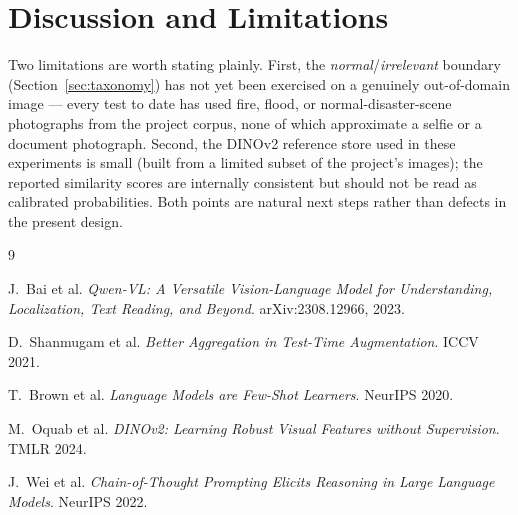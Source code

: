 \documentclass[11pt, a4paper]{article}
\begin{document}
\section{Discussion and Limitations}

Two limitations are worth stating plainly. First, the \emph{normal}/\emph{irrelevant} boundary
(Section~\ref{sec:taxonomy}) has not yet been exercised on a genuinely out-of-domain image ---
every test to date has used fire, flood, or normal-disaster-scene photographs from the project
corpus, none of which approximate a selfie or a document photograph. Second, the DINOv2
reference store used in these experiments is small (built from a limited subset of the
project's images); the reported similarity scores are internally consistent but should not be
read as calibrated probabilities. Both points are natural next steps rather than defects in the
present design.

\vspace{4pt}
\begin{thebibliography}{9}
\small

  J.\ Bai et al.
  \textit{Qwen-VL: A Versatile Vision-Language Model for Understanding, Localization, Text
  Reading, and Beyond}.
  arXiv:2308.12966, 2023.

  D.\ Shanmugam et al.
  \textit{Better Aggregation in Test-Time Augmentation}.
  ICCV 2021.

  T.\ Brown et al.
  \textit{Language Models are Few-Shot Learners}.
  NeurIPS 2020.

  M.\ Oquab et al.
  \textit{DINOv2: Learning Robust Visual Features without Supervision}.
  TMLR 2024.

  J.\ Wei et al.
  \textit{Chain-of-Thought Prompting Elicits Reasoning in Large Language Models}.
  NeurIPS 2022.

\end{thebibliography}
\end{document}
